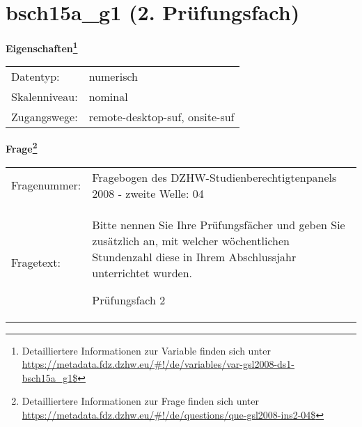 
    \setcounter{footnote}{0}

    \vspace*{-1.8cm}
	\section{bsch15a\_g1 (2. Prüfungsfach)}
	\label{section:bsch15a_g1}



    \vspace*{0.5cm}
    \noindent\textbf{Eigenschaften\footnote{Detailliertere Informationen zur Variable finden sich unter
		\url{https://metadata.fdz.dzhw.eu/\#!/de/variables/var-gsl2008-ds1-bsch15a_g1$}}}\\
	\begin{tabularx}{\hsize}{@{}lX}
	Datentyp: & numerisch \\
	Skalenniveau: & nominal \\
	Zugangswege: &
	  remote-desktop-suf, 
	  onsite-suf
 \\
    \end{tabularx}



				\vspace*{0.5cm}
                \noindent\textbf{Frage\footnote{Detailliertere Informationen zur Frage finden sich unter
		              \url{https://metadata.fdz.dzhw.eu/\#!/de/questions/que-gsl2008-ins2-04$}}}\\
				\begin{tabularx}{\hsize}{@{}lX}
					Fragenummer: &
					  Fragebogen des DZHW-Studienberechtigtenpanels 2008 - zweite Welle:
					  04
 \\
					Fragetext: & Bitte nennen Sie Ihre Prüfungsfächer und geben Sie zusätzlich an, mit welcher wöchentlichen Stundenzahl diese in Ihrem Abschlussjahr unterrichtet wurden.\par  Prüfungsfach 2 \\
				\end{tabularx}





